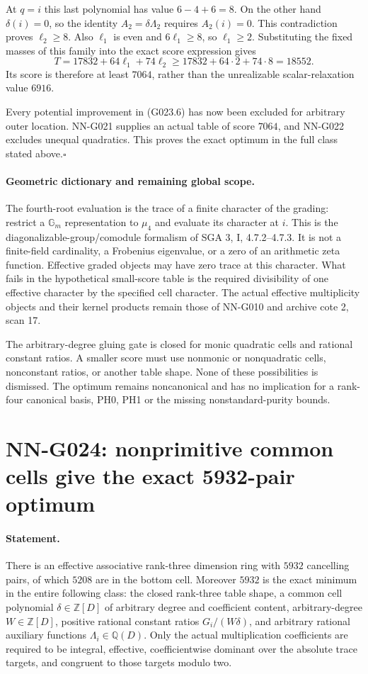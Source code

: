 At $q=i$ this last polynomial has value $6-4+6=8$.
On the other hand $\delta(i)=0$, so the identity
$A_2=\delta\Lambda_2$ requires $A_2(i)=0$.
This contradiction proves $\ell_2\ge8$.
Also $\ell_1$ is even and $6\ell_1\ge8$, so
$\ell_1\ge2$. Substituting the fixed masses of this
family into the exact score expression gives
\[
 T=17832+64\ell_1+74\ell_2
       \ge17832+64\cdot2+74\cdot8=18552.
\]
Its score is therefore at least $7064$, rather than
the unrealizable scalar-relaxation value $6916$.

Every potential improvement in (G023.6) has now been
excluded for arbitrary outer location. NN-G021 supplies
an actual table of score $7064$, and NN-G022 excludes
unequal quadratics. This proves the exact optimum in
the full class stated above.\hfill$\square$

\paragraph{Geometric dictionary and remaining global scope.}
The fourth-root evaluation is the trace of a finite
character of the grading: restrict a $\mathbb G_m$
representation to $\mu_4$ and evaluate its character at
$i$. This is the diagonalizable-group/comodule formalism
of SGA 3, I, 4.7.2--4.7.3. It is not a finite-field
cardinality, a Frobenius eigenvalue, or a zero of an
arithmetic zeta function. Effective graded objects may
have zero trace at this character. What fails in the
hypothetical small-score table is the required divisibility
of one effective character by the specified cell character.
The actual effective multiplicity objects and their
kernel products remain those of NN-G010 and archive
cote 2, scan 17.

The arbitrary-degree gluing gate is closed for monic
quadratic cells and rational constant ratios. A smaller
score must use nonmonic or nonquadratic cells, nonconstant
ratios, or another
table shape. None of these possibilities is dismissed.
The optimum remains noncanonical and has no implication
for a rank-four canonical basis, PH0, PH1 or the missing
nonstandard-purity bounds.



\section{NN-G024: nonprimitive common cells give the exact 5932-pair optimum}
\paragraph{Statement.}
There is an effective associative rank-three dimension ring with
$5932$ cancelling pairs, of which $5208$ are in the bottom cell.
Moreover $5932$ is the exact minimum in the entire following
class: the closed rank-three table shape, a common cell polynomial
$\delta\in\mathbb Z[D]$ of arbitrary degree and coefficient content,
arbitrary-degree $W\in\mathbb Z[D]$, positive rational constant
ratios $G_i/(W\delta)$, and arbitrary rational auxiliary functions
$\Lambda_i\in\mathbb Q(D)$. Only the actual multiplication
coefficients are required to be integral, effective, coefficientwise
dominant over the absolute trace targets, and congruent to those
targets modulo two.

